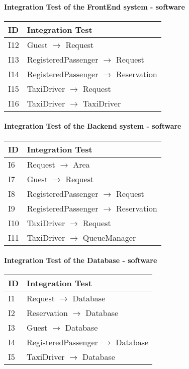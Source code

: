 	\paragraph{Integration Test of the FrontEnd system - software}
	\begin{tabular}{p{2cm} | p{10cm}} \hline
		\textbf{ID} & \textbf{Integration Test} \\ \hline
		I12 & Guest $\rightarrow$ Request \\ \hline
		I13 & RegisteredPassenger $\rightarrow$ Request \\ \hline
		I14 & RegisteredPassenger $\rightarrow$ Reservation \\ \hline
		I15 & TaxiDriver $\rightarrow$ Request \\ \hline
		I16 & TaxiDriver $\rightarrow$ TaxiDriver \\ \hline
	\end{tabular}
	\paragraph{Integration Test of the Backend system - software}
	\begin{tabular}{p{2cm} | p{10cm}} \hline
		\textbf{ID} & \textbf{Integration Test} \\ \hline
		I6 & Request $\rightarrow$ Area \\ \hline
		I7 & Guest $\rightarrow$ Request \\ \hline
		I8 & RegisteredPassenger $\rightarrow$ Request \\ \hline
		I9 & RegisteredPassenger $\rightarrow$ Reservation \\ \hline
		I10 & TaxiDriver $\rightarrow$ Request \\ \hline
		I11 & TaxiDriver $\rightarrow$ QueueManager \\ \hline
	\end{tabular}
	\paragraph{Integration Test of the Database - software}
	\begin{tabular}{p{2cm} | p{10cm}} \hline
		\textbf{ID} & \textbf{Integration Test} \\ \hline
		I1 & Request $\rightarrow$ Database \\ \hline
		I2 & Reservation $\rightarrow$ Database \\ \hline
		I3 & Guest $\rightarrow$ Database \\ \hline
		I4 & RegisteredPassenger $\rightarrow$ Database \\ \hline
		I5 & TaxiDriver $\rightarrow$ Database \\ \hline
	\end{tabular}
